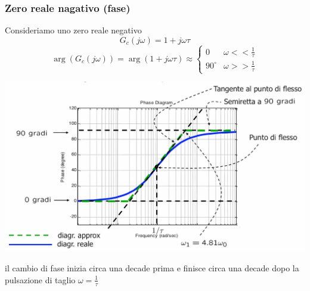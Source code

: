 \documentclass{article}
\numberwithin{equation}{subsection}
\begin{document}
\subsubsection{Zero reale nagativo (fase)}
Consideriamo uno zero reale negativo
\[
    G_c(j\omega) = 1 + j \omega \tau  \tag*{$\tau > 0$}
\]
\[
    \arg(G_c(j\omega)) = \arg(1+j\omega \tau) \approx 
    \begin{cases}
        0 &\omega << \frac{1}{\tau}\\
        90^\circ & \omega >> \frac{1}{\tau}
    \end{cases}    
\]
\begin{center}
    \includegraphics[scale=0.125]{Images/Diagramma_zero_reale_negativo.png}
\end{center}
il cambio di fase inizia circa una decade prima e finisce circa una decade dopo la pulsazione di taglio $\omega = \frac{1}{\tau}$
\end{document}
